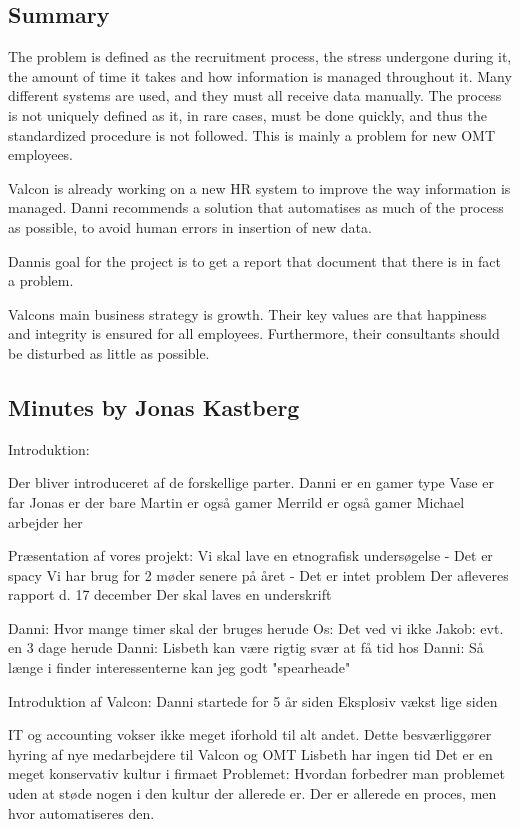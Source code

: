 \label{app:danni_initiation}

\subsection{Summary}

The problem is defined as the recruitment process, the stress undergone during it, the amount of time it takes and how information is managed throughout it. Many different systems are used, and they must all receive data manually.
The process is not uniquely defined as it, in rare cases, must be done quickly, and thus the standardized procedure is not followed. This is mainly a problem for new OMT employees.

Valcon is already working on a new HR system to improve the way information is managed. Danni recommends a solution that automatises as much of the process as possible, to avoid human errors in insertion of new data.

Dannis goal for the project is to get a report that document that there is in fact a problem.

Valcons main business strategy is growth.
Their key values are that happiness and integrity is ensured for all employees. Furthermore, their consultants should be disturbed as little as possible.

\subsection{Minutes by Jonas Kastberg}
Introduktion:

Der bliver introduceret af de forskellige parter.
Danni er en gamer type
Vase er far
Jonas er der bare
Martin er også gamer
Merrild er også gamer
Michael arbejder her

Præsentation af vores projekt:
Vi skal lave en etnografisk undersøgelse
	- Det er spacy
Vi har brug for 2 møder senere på året
	- Det er intet problem
Der afleveres rapport d. 17 december
Der skal laves en underskrift



Danni: Hvor mange timer skal der bruges herude
Os: Det ved vi ikke
Jakob: evt. en 3 dage herude
Danni: Lisbeth kan være rigtig svær at få tid hos
Danni: Så længe i finder interessenterne kan jeg godt "spearheade"


Introduktion af Valcon:
Danni startede for 5 år siden
Eksplosiv vækst lige siden

IT og accounting vokser ikke meget iforhold til alt andet.
Dette besværliggører hyring af nye medarbejdere til Valcon og OMT
Lisbeth har ingen tid
Det er en meget konservativ kultur i firmaet
Problemet: Hvordan forbedrer man problemet uden at støde nogen i den kultur der allerede er.
Der er allerede en proces, men hvor automatiseres den.

